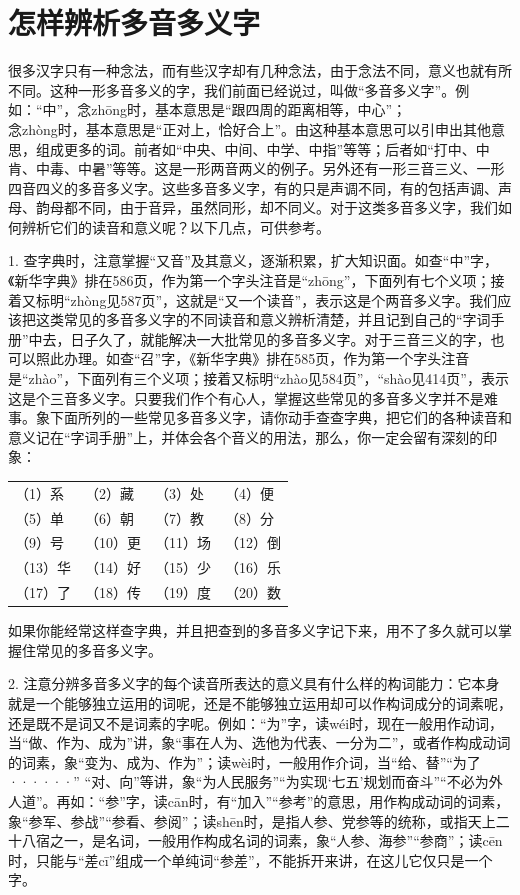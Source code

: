 \section{怎样辨析多音多义字}
很多汉字只有一种念法，而有些汉字却有几种念法，由于念法不同，意义也就有所不同。这种一形多音多义的字，我们前面已经说过，叫做“多音多义字”。例如：“中”，念zhōng时，基本意思是“跟四周的距离相等，中心”；\\
念zhòng时，基本意思是“正对上，恰好合上”。由这种基本意思可以引申出其他意思，组成更多的词。前者如“中央、中间、中学、中指”等等；后者如“打中、中肯、中毒、中暑”等等。这是一形两音两义的例子。另外还有一形三音三义、一形四音四义的多音多义字。这些多音多义字，有的只是声调不同，有的包括声调、声母、韵母都不同，由于音异，虽然同形，却不同义。对于这类多音多义字，我们如何辨析它们的读音和意义呢？以下几点，可供参考。

1. 查字典时，注意掌握“又音”及其意义，逐渐积累，扩大知识面。如查“中”字，《新华字典》排在586页，作为第一个字头注音是“zhōng”，下面列有七个义项；接着又标明“zhòng见587页”，这就是“又一个读音”，表示这是个两音多义字。我们应该把这类常见的多音多义字的不同读音和意义辨析清楚，并且记到自己的“字词手册”中去，日子久了，就能解决一大批常见的多音多义字。对于三音三义的字，也可以照此办理。如查“召”字，《新华字典》排在585页，作为第一个字头注音是“zhào”，下面列有三个义项；接着又标明“zhào见584页”，“shào见414页”，表示这是个三音多义字。只要我们作个有心人，掌握这些常见的多音多义字并不是难事。象下面所列的一些常见多音多义字，请你动手查查字典，把它们的各种读音和意义记在“字词手册”上，并体会各个音义的用法，那么，你一定会留有深刻的印象：

\noindent
\begin{tabular}{llll}
（1）系 & （2）藏 & （3）处 &（4）便\\
（5）单 & （6）朝 & （7）教 & （8）分\\
（9）号 & （10）更 & （11）场 & （12）倒\\
（13）华 & （14）好 & （15）少 & （16）乐\\
（17）了 & （18）传 & （19）度 & （20）数\\
\end{tabular}
\vspace{1em}

如果你能经常这样查字典，并且把查到的多音多义字记下来，用不了多久就可以掌握住常见的多音多义字。

2. 注意分辨多音多义字的每个读音所表达的意义具有什么样的构词能力：它本身就是一个能够独立运用的词呢，还是不能够独立运用却可以作构词成分的词素呢，还是既不是词又不是词素的字呢。例如：“为”字，读wéi时，现在一般用作动词，当“做、作为、成为”讲，象“事在人为、选他为代表、一分为二”，或者作构成动词的词素，象“变为、成为、作为”；读wèi时，一般用作介词，当“给、替”“为了······” “对、向”等讲，象“为人民服务”“为实现‘七五’规划而奋斗”“不必为外人道”。再如：“参”字，读cān时，有“加入”“参考”的意思，用作构成动词的词素，象“参军、参战”“参看、参阅”；读shēn时，是指人参、党参等的统称，或指天上二十八宿之一，是名词，一般用作构成名词的词素，象“人参、海参”“参商”；读cēn时，只能与“差cī”组成一个单纯词“参差”，不能拆开来讲，在这儿它仅只是一个字。

